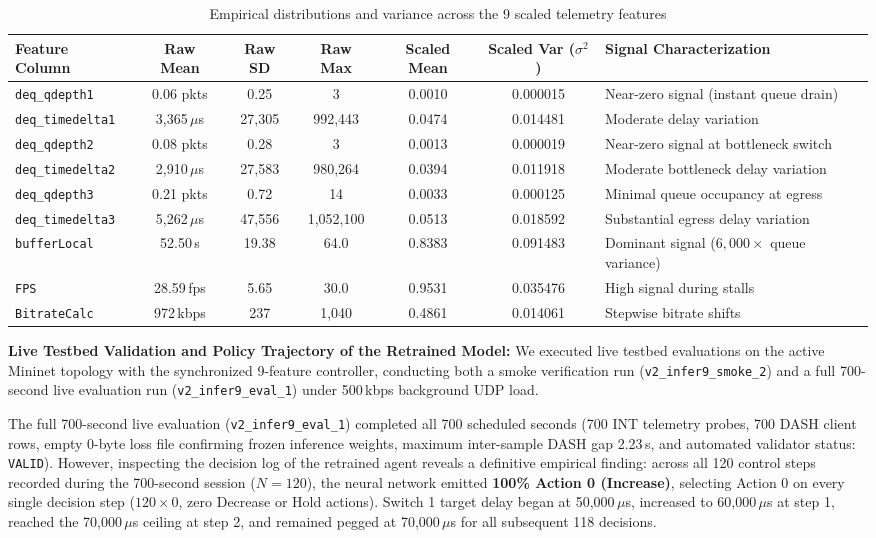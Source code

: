 \documentclass[12pt,a4paper,oneside]{report}
\begin{document}
\begin{table}[H]
\centering
\small
\caption{Empirical distributions and variance across the 9 scaled telemetry features}
\label{tab:feature_variance}
\begin{tabularx}{\textwidth}{lcccccX}
\toprule
\textbf{Feature Column} & \textbf{Raw Mean} & \textbf{Raw SD} & \textbf{Raw Max} & \textbf{Scaled Mean} & \textbf{Scaled Var ($\sigma^2$)} & \textbf{Signal Characterization} \\
\midrule
\texttt{deq\_qdepth1} & 0.06 pkts & 0.25 & 3 & 0.0010 & 0.000015 & Near-zero signal (instant queue drain) \\
\texttt{deq\_timedelta1} & 3,365\,$\mu$s & 27,305 & 992,443 & 0.0474 & 0.014481 & Moderate delay variation \\
\texttt{deq\_qdepth2} & 0.08 pkts & 0.28 & 3 & 0.0013 & 0.000019 & Near-zero signal at bottleneck switch \\
\texttt{deq\_timedelta2} & 2,910\,$\mu$s & 27,583 & 980,264 & 0.0394 & 0.011918 & Moderate bottleneck delay variation \\
\texttt{deq\_qdepth3} & 0.21 pkts & 0.72 & 14 & 0.0033 & 0.000125 & Minimal queue occupancy at egress \\
\texttt{deq\_timedelta3} & 5,262\,$\mu$s & 47,556 & 1,052,100 & 0.0513 & 0.018592 & Substantial egress delay variation \\
\texttt{bufferLocal} & 52.50\,s & 19.38 & 64.0 & 0.8383 & 0.091483 & Dominant signal ($6,000\times$ queue variance) \\
\texttt{FPS} & 28.59\,fps & 5.65 & 30.0 & 0.9531 & 0.035476 & High signal during stalls \\
\texttt{BitrateCalc} & 972\,kbps & 237 & 1,040 & 0.4861 & 0.014061 & Stepwise bitrate shifts \\
\bottomrule
\end{tabularx}
\end{table}

\textbf{Live Testbed Validation and Policy Trajectory of the Retrained Model:}
We executed live testbed evaluations on the active Mininet topology with the synchronized 9-feature controller, conducting both a smoke verification run (\texttt{v2\_infer9\_smoke\_2}) and a full 700-second live evaluation run (\texttt{v2\_infer9\_eval\_1}) under 500\,kbps background UDP load.

The full 700-second live evaluation (\texttt{v2\_infer9\_eval\_1}) completed all 700 scheduled seconds (700 INT telemetry probes, 700 DASH client rows, empty 0-byte loss file confirming frozen inference weights, maximum inter-sample DASH gap 2.23\,s, and automated validator status: \texttt{VALID}). However, inspecting the decision log of the retrained agent reveals a definitive empirical finding: across all 120 control steps recorded during the 700-second session ($N=120$), the neural network emitted \textbf{100\% Action 0 (Increase)}, selecting Action 0 on every single decision step ($120 \times 0$, zero Decrease or Hold actions). Switch 1 target delay began at 50,000\,$\mu$s, increased to 60,000\,$\mu$s at step 1, reached the 70,000\,$\mu$s ceiling at step 2, and remained pegged at 70,000\,$\mu$s for all subsequent 118 decisions. 
\end{document}
